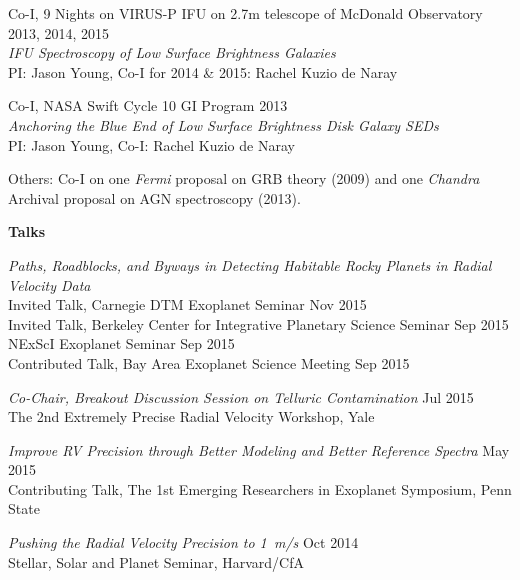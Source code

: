 \begin{small}
Co-I, 9 Nights on VIRUS-P IFU on 2.7m telescope of McDonald
Observatory \hfill 2013, 2014, 2015 \\
{\it IFU Spectroscopy of Low Surface Brightness Galaxies} \\
PI: Jason Young, Co-I for 2014 \& 2015: Rachel Kuzio de Naray
\vspace{10pt}

Co-I, NASA Swift Cycle 10 GI Program \hfill 2013 \\
{\it Anchoring the Blue End of Low Surface Brightness Disk Galaxy SEDs}\\
PI: Jason Young, Co-I: Rachel Kuzio de Naray
\vspace{10pt}

Others: Co-I on one {\it Fermi} proposal on GRB theory (2009) and one {\it
  Chandra} Archival proposal on AGN spectroscopy (2013).





{\bf Talks}
\vspace{10pt}

{\sl Paths, Roadblocks, and Byways in Detecting Habitable Rocky
  Planets in Radial Velocity Data} \\
Invited Talk, Carnegie DTM Exoplanet Seminar \hfill Nov 2015\\
Invited Talk, Berkeley Center for Integrative Planetary Science Seminar \hfill Sep 2015\\
NExScI Exoplanet Seminar \hfill Sep 2015\\
Contributed Talk, Bay Area Exoplanet Science Meeting \hfill Sep 2015

\vspace{10pt}
{\sl Co-Chair, Breakout Discussion Session on Telluric Contamination} \hfill
Jul 2015 \\
The 2nd Extremely Precise Radial Velocity Workshop, Yale

\vspace{10pt}
{\sl Improve RV Precision through Better Modeling and
  Better Reference Spectra} \hfill  May 2015\\
Contributing Talk, The 1st Emerging Researchers in Exoplanet
Symposium, Penn State

\vspace{10pt}
{\sl Pushing the Radial Velocity Precision to 1~m/s} \hfill   Oct 2014 \\
Stellar, Solar and Planet Seminar, Harvard/CfA
% 


\end{small}

